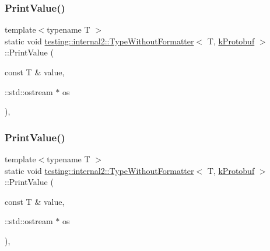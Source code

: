 \subsubsection{\texorpdfstring{PrintValue()}{PrintValue()}\hspace{0.1cm}{\footnotesize\ttfamily [1/3]}}
{\footnotesize\ttfamily template$<$typename T $>$ \\
static void \mbox{\hyperlink{classtesting_1_1internal2_1_1_type_without_formatter}{testing\+::internal2\+::\+Type\+Without\+Formatter}}$<$ T, \mbox{\hyperlink{namespacetesting_1_1internal2_aeb8161b0b3ee503347b0662d7028fd57ab6c394f7612d98d3a4a0514b2d6eb840}{k\+Protobuf}} $>$\+::Print\+Value (\begin{DoxyParamCaption}\item[{const T \&}]{value,  }\item[{\+::std\+::ostream $\ast$}]{os }\end{DoxyParamCaption})\hspace{0.3cm}{\ttfamily [inline]}, {\ttfamily [static]}}

\mbox{\label{classtesting_1_1internal2_1_1_type_without_formatter_3_01_t_00_01k_protobuf_01_4_ac96fb775dc776f02da9a671ea0e04599}} 
\subsubsection{\texorpdfstring{PrintValue()}{PrintValue()}\hspace{0.1cm}{\footnotesize\ttfamily [2/3]}}
{\footnotesize\ttfamily template$<$typename T $>$ \\
static void \mbox{\hyperlink{classtesting_1_1internal2_1_1_type_without_formatter}{testing\+::internal2\+::\+Type\+Without\+Formatter}}$<$ T, \mbox{\hyperlink{namespacetesting_1_1internal2_aeb8161b0b3ee503347b0662d7028fd57ab6c394f7612d98d3a4a0514b2d6eb840}{k\+Protobuf}} $>$\+::Print\+Value (\begin{DoxyParamCaption}\item[{const T \&}]{value,  }\item[{\+::std\+::ostream $\ast$}]{os }\end{DoxyParamCaption})\hspace{0.3cm}{\ttfamily [inline]}, {\ttfamily [static]}}

